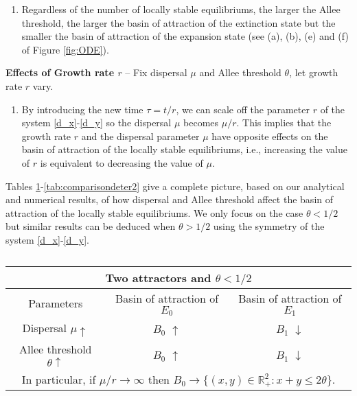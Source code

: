 \begin{description}
\begin{enumerate}
\item[] Regardless of the number of locally stable equilibriums, the larger the Allee threshold, the larger the basin of attraction of the
 extinction state but the smaller the basin of attraction of the expansion state (see (a), (b), (e) and (f) of Figure \ref{fig:ODE}). \vspace{4pt}
\end{enumerate}
\item {\bf Effects of Growth rate $r$} -- Fix dispersal $\mu$ and Allee threshold $\theta$, let growth rate $r$ vary. \vspace{4pt}
\begin{enumerate}
\item[] By introducing the new time $\tau = t / r$, we can scale off the parameter $r$ of the
 system \eqref{d_x}-\eqref{d_y} so the dispersal $\mu$ becomes $\mu / r$.
 This implies that the growth rate $r$ and the dispersal parameter $\mu$ have opposite effects on the basin of attraction of the locally
 stable equilibriums, i.e., increasing the value of $r$ is equivalent to decreasing the value of $\mu$.
\end{enumerate}
\end{description}
\noindent Tables \ref{tab:comparisondeter1}-\ref{tab:comparisondeter2} give a complete picture, based on our analytical and numerical
 results, of how dispersal and Allee threshold affect the basin of attraction of the locally stable equilibriums.
 We only focus on the case $\theta < 1/2$ but similar results can be deduced when $\theta > 1/2$ using the symmetry of the system \eqref{d_x}-\eqref{d_y}.
\begin{table}[h]\begin{center}
\caption{}
\label{tab:comparisondeter1}
\begin{tabular}{|c|c|c|}\hline
\multicolumn{3}{|c|}{Two attractors and $\theta < 1/2$} \\
\hline
 Parameters                        & Basin of attraction of $E_0$ & Basin of attraction of $E_1$ \\ \hline
 Dispersal $\mu \uparrow$          & $B_0$ $\uparrow$             & $B_1$ $\downarrow$ \\ \hline
 Allee threshold $\theta \uparrow$ & $B_0$ $\uparrow$             & $B_1$ $\downarrow$ \\ \hline
\multicolumn{3}{|c|}{In particular, if $\mu / r \rightarrow \infty$ then $B_0 \rightarrow \{(x,y) \in {{\mathbb{R}}}^2_+: x + y \leq 2 \theta\}$.} \\
\hline
\end{tabular}
\end{center}
\end{table}
